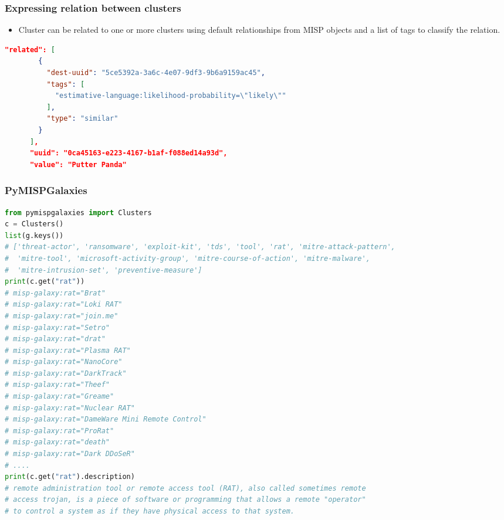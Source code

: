 \begin{frame}[fragile]
        \frametitle{Expressing relation between clusters}
        \begin{itemize}
                \item Cluster can be related to one or more clusters using default relationships from MISP objects and a list of tags to classify the relation.
        \end{itemize}

        \begin{lstlisting}[language=json,firstnumber=1]
        "related": [
        {
          "dest-uuid": "5ce5392a-3a6c-4e07-9df3-9b6a9159ac45",
          "tags": [
            "estimative-language:likelihood-probability=\"likely\""
          ],
          "type": "similar"
        }
      ],
      "uuid": "0ca45163-e223-4167-b1af-f088ed14a93d",
      "value": "Putter Panda"
        \end{lstlisting}
\end{frame}



\begin{frame}[fragile]
\frametitle{PyMISPGalaxies}
        \begin{adjustbox}{keepaspectratio}
\begin{lstlisting}[language=Python,basicstyle=\tiny]
from pymispgalaxies import Clusters
c = Clusters()
list(g.keys())
# ['threat-actor', 'ransomware', 'exploit-kit', 'tds', 'tool', 'rat', 'mitre-attack-pattern',
#  'mitre-tool', 'microsoft-activity-group', 'mitre-course-of-action', 'mitre-malware',
#  'mitre-intrusion-set', 'preventive-measure']
print(c.get("rat"))
# misp-galaxy:rat="Brat"
# misp-galaxy:rat="Loki RAT"
# misp-galaxy:rat="join.me"
# misp-galaxy:rat="Setro"
# misp-galaxy:rat="drat"
# misp-galaxy:rat="Plasma RAT"
# misp-galaxy:rat="NanoCore"
# misp-galaxy:rat="DarkTrack"
# misp-galaxy:rat="Theef"
# misp-galaxy:rat="Greame"
# misp-galaxy:rat="Nuclear RAT"
# misp-galaxy:rat="DameWare Mini Remote Control"
# misp-galaxy:rat="ProRat"
# misp-galaxy:rat="death"
# misp-galaxy:rat="Dark DDoSeR"
# ....
print(c.get("rat").description)
# remote administration tool or remote access tool (RAT), also called sometimes remote
# access trojan, is a piece of software or programming that allows a remote "operator"
# to control a system as if they have physical access to that system.
\end{lstlisting}
                \end{adjustbox}
\end{frame}


